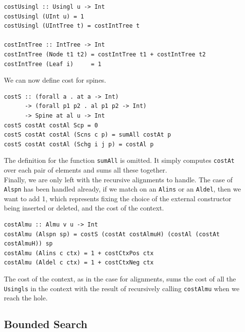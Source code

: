 \documentclass[11pt, titlepage]{article}
\newcommand{\toHaskell}[1]{\texttt{#1}\xspace}
\newcommand{\alins}{\toHaskell{Alins}}
\newcommand{\aldel}{\toHaskell{Aldel}}
\newcommand{\alspn}{\toHaskell{Alspn}}
\begin{document}
\begin{verbatim}
costUsingl :: Usingl u -> Int
costUsingl (UInt u) = 1
costUsingl (UIntTree t) = costIntTree t

costIntTree :: IntTree -> Int
costIntTree (Node t1 t2) = costIntTree t1 + costIntTree t2
costIntTree (Leaf i)     = 1
\end{verbatim}

We can now define cost for spines.

\begin{verbatim}
costS :: (forall a . at a -> Int)
      -> (forall p1 p2 . al p1 p2 -> Int)
      -> Spine at al u -> Int
costS costAt costAl Scp = 0
costS costAt costAl (Scns c p) = sumAll costAt p
costS costAt costAl (Schg i j p) = costAl p
\end{verbatim}

The definition for the function \toHaskell{sumAll} is omitted. It simply computes \toHaskell{costAt} over each pair of elements and sums all these together.
\\
Finally, we are only left with the recursive alignments to handle. The case of \alspn has been handled already, if we match on an \alins or an \aldel, then we want to add 1, which represents fixing the choice of the external constructor being inserted or deleted, and the cost of the context.

\begin{verbatim}
costAlmu :: Almu v u -> Int
costAlmu (Alspn sp) = costS (costAt costAlmuH) (costAl (costAt costAlmuH)) sp
costAlmu (Alins c ctx) = 1 + costCtxPos ctx
costAlmu (Aldel c ctx) = 1 + costCtxNeg ctx
\end{verbatim}

The cost of the context, as in the case for alignments, sums the cost of all the \toHaskell{Usingls} in the context with the result of recursively calling \toHaskell{costAlmu} when we reach the hole.


\subsection{Bounded Search}\label{bd-search}
\end{document}
